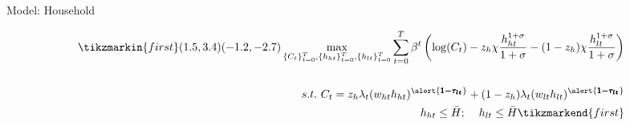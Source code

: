 \documentclass[11pt,aspectratio=169]{beamer}
\begin{document}
\begin{frame}{Model: Household}

\vspace{2mm}
\begin{minipage}[t!]{1\textwidth}
	\begin{align*}
	\tikzmarkin{first}(1.5,3.4)(-1.2,-2.7)
 \max_{\{C_t\}_{t=0}^T, \{h_{ht}\}_{t=0}^T, \{h_{lt}\}_{t=0}^T} \sum_{t=0}^T \beta^t \left(\log(C_t)-z_h\chi\frac{h_{ht}^{1+\sigma}}{1+\sigma}-(1-z_h)\chi\frac{h_{lt}^{1+\sigma}}{1+\sigma}\right) %
\\
\vspace{4mm}
\\
s.t.\ C_t=z_h \lambda_t (w_{ht}h_{ht})^{\alert{\pmb{1-\tau_{lt}}}}+(1-z_h) \lambda_t (w_{lt}h_{lt})^{\alert{\pmb{1-\tau_{lt}}}}%
\\
\hspace{2mm}\ h_{ht}\leq \bar{H}; \hspace{4mm} h_{lt}\leq \bar{H}
	\tikzmarkend{first}
	\end{align*}
\end{minipage}

%


\end{frame}
\end{document}
